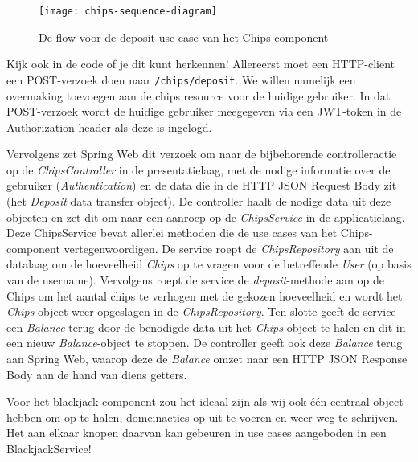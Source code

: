 \begin{figure}[H]
    \centering
    \texttt{[image: chips-sequence-diagram]}
    \caption{De flow voor de deposit use case van het Chips-component}
    \label{fig:chips-sequence-diagram}
\end{figure}

Kijk ook in de code of je dit kunt herkennen!
Allereerst moet een HTTP-client een POST-verzoek doen naar 
\texttt{/chips/deposit}. We willen namelijk een overmaking toevoegen
aan de chips resource voor de huidige gebruiker. In dat POST-verzoek 
wordt de huidige gebruiker meegegeven via een JWT-token in de Authorization header
als deze is ingelogd. 

Vervolgens zet Spring Web dit verzoek om naar de bijbehorende 
controlleractie op de \emph{ChipsController} in de presentatielaag, met de
nodige informatie over de gebruiker (\emph{Authentication}) en de data die 
in de HTTP JSON Request Body zit (het \emph{Deposit} data transfer object).
De controller haalt de nodige data uit deze objecten en zet dit om naar 
een aanroep op de \emph{ChipsService} in de applicatielaag. 
Deze ChipsService bevat allerlei methoden die de use cases van 
het Chips-component vertegenwoordigen.
De service roept de \emph{ChipsRepository} aan uit de datalaag om de hoeveelheid
\emph{Chips} op te vragen voor de betreffende \emph{User} (op basis van de username). 
Vervolgens roept de service de \emph{deposit}-methode aan op de Chips om het aantal chips te verhogen met de 
gekozen hoeveelheid en wordt het \emph{Chips} object weer opgeslagen in de \emph{ChipsRepository}.
Ten slotte geeft de service een \emph{Balance} terug door de benodigde data uit het 
\emph{Chips}-object te halen en dit in een nieuw \emph{Balance}-object te stoppen.
De controller geeft ook deze \emph{Balance} terug aan Spring Web, waarop deze de 
\emph{Balance} omzet naar een HTTP JSON Response Body aan de hand van diens getters.

Voor het blackjack-component zou het ideaal zijn als wij ook één centraal object hebben 
om op te halen, domeinacties op uit te voeren en weer weg te schrijven. Het aan elkaar 
knopen daarvan kan gebeuren in use cases aangeboden in een BlackjackService!